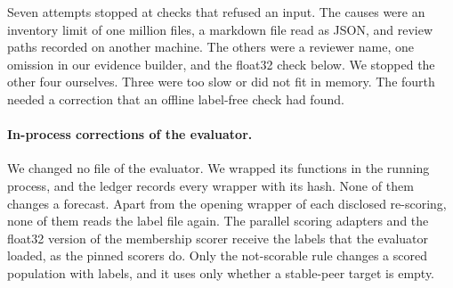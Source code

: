 Seven attempts stopped at checks that refused an input.
The causes were an inventory limit of one million files, a markdown file read as JSON, and review paths recorded on another machine.
The others were a reviewer name, one omission in our evidence builder, and the float32 check below.
We stopped the other four ourselves.
Three were too slow or did not fit in memory.
The fourth needed a correction that an offline label-free check had found.

\paragraph{In-process corrections of the evaluator.}
We changed no file of the evaluator.
We wrapped its functions in the running process, and the ledger records every wrapper with its hash.
None of them changes a forecast.
Apart from the opening wrapper of each disclosed re-scoring, none of them reads the label file again.
The parallel scoring adapters and the float32 version of the membership scorer receive the labels that the evaluator loaded, as the pinned scorers do.
Only the not-scorable rule changes a scored population with labels, and it uses only whether a stable-peer target is empty.
